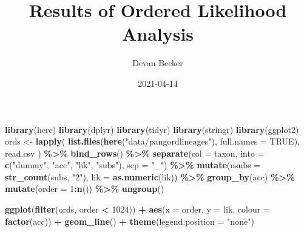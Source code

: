 \documentclass[
]{article}
\title{Results of Ordered Likelihood Analysis}
\author{Devan Becker}
\date{2021-04-14}
\newenvironment{Shaded}{\begin{snugshade}}{\end{snugshade}}
\newcommand{\DataTypeTok}[1]{\textcolor[rgb]{0.13,0.29,0.53}{#1}}
\newcommand{\DecValTok}[1]{\textcolor[rgb]{0.00,0.00,0.81}{#1}}
\newcommand{\KeywordTok}[1]{\textcolor[rgb]{0.13,0.29,0.53}{\textbf{#1}}}
\newcommand{\NormalTok}[1]{#1}
\newcommand{\OperatorTok}[1]{\textcolor[rgb]{0.81,0.36,0.00}{\textbf{#1}}}
\newcommand{\OtherTok}[1]{\textcolor[rgb]{0.56,0.35,0.01}{#1}}
\newcommand{\StringTok}[1]{\textcolor[rgb]{0.31,0.60,0.02}{#1}}
\begin{document}
\maketitle

\begin{Shaded}
\begin{Highlighting}[]
\KeywordTok{library}\NormalTok{(here)}
\KeywordTok{library}\NormalTok{(dplyr)}
\KeywordTok{library}\NormalTok{(tidyr)}
\KeywordTok{library}\NormalTok{(stringr)}
\KeywordTok{library}\NormalTok{(ggplot2)}
\NormalTok{ords \textless{}{-}}\StringTok{ }\KeywordTok{lapply}\NormalTok{(}
    \KeywordTok{list.files}\NormalTok{(}\KeywordTok{here}\NormalTok{(}\StringTok{"data/pangordlineages"}\NormalTok{),}
        \DataTypeTok{full.names =} \OtherTok{TRUE}\NormalTok{),}
\NormalTok{    read.csv}
\NormalTok{    ) }\OperatorTok{\%\textgreater{}\%}
\StringTok{    }\KeywordTok{bind\_rows}\NormalTok{() }\OperatorTok{\%\textgreater{}\%}
\StringTok{    }\KeywordTok{separate}\NormalTok{(}\DataTypeTok{col =}\NormalTok{ taxon, }
        \DataTypeTok{into =} \KeywordTok{c}\NormalTok{(}\StringTok{"dummy"}\NormalTok{, }\StringTok{"acc"}\NormalTok{, }\StringTok{"lik"}\NormalTok{, }\StringTok{"subs"}\NormalTok{),}
        \DataTypeTok{sep =} \StringTok{"\_"}\NormalTok{) }\OperatorTok{\%\textgreater{}\%}
\StringTok{    }\KeywordTok{mutate}\NormalTok{(}\DataTypeTok{nsubs =} \KeywordTok{str\_count}\NormalTok{(subs, }\StringTok{"2"}\NormalTok{),}
        \DataTypeTok{lik =} \KeywordTok{as.numeric}\NormalTok{(lik)) }\OperatorTok{\%\textgreater{}\%}
\StringTok{    }\KeywordTok{group\_by}\NormalTok{(acc) }\OperatorTok{\%\textgreater{}\%}
\StringTok{    }\KeywordTok{mutate}\NormalTok{(}\DataTypeTok{order =} \DecValTok{1}\OperatorTok{:}\KeywordTok{n}\NormalTok{()) }\OperatorTok{\%\textgreater{}\%}
\StringTok{    }\KeywordTok{ungroup}\NormalTok{()}
\end{Highlighting}
\end{Shaded}

\begin{Shaded}
\begin{Highlighting}[]
\KeywordTok{ggplot}\NormalTok{(}\KeywordTok{filter}\NormalTok{(ords, order }\OperatorTok{\textless{}}\StringTok{ }\DecValTok{1024}\NormalTok{)) }\OperatorTok{+}
\StringTok{    }\KeywordTok{aes}\NormalTok{(}\DataTypeTok{x =}\NormalTok{ order, }\DataTypeTok{y =}\NormalTok{ lik, }\DataTypeTok{colour =} \KeywordTok{factor}\NormalTok{(acc)) }\OperatorTok{+}\StringTok{ }
\StringTok{    }\KeywordTok{geom\_line}\NormalTok{() }\OperatorTok{+}
\StringTok{    }\KeywordTok{theme}\NormalTok{(}\DataTypeTok{legend.position =} \StringTok{"none"}\NormalTok{)}
\end{Highlighting}
\end{Shaded}
\end{document}
